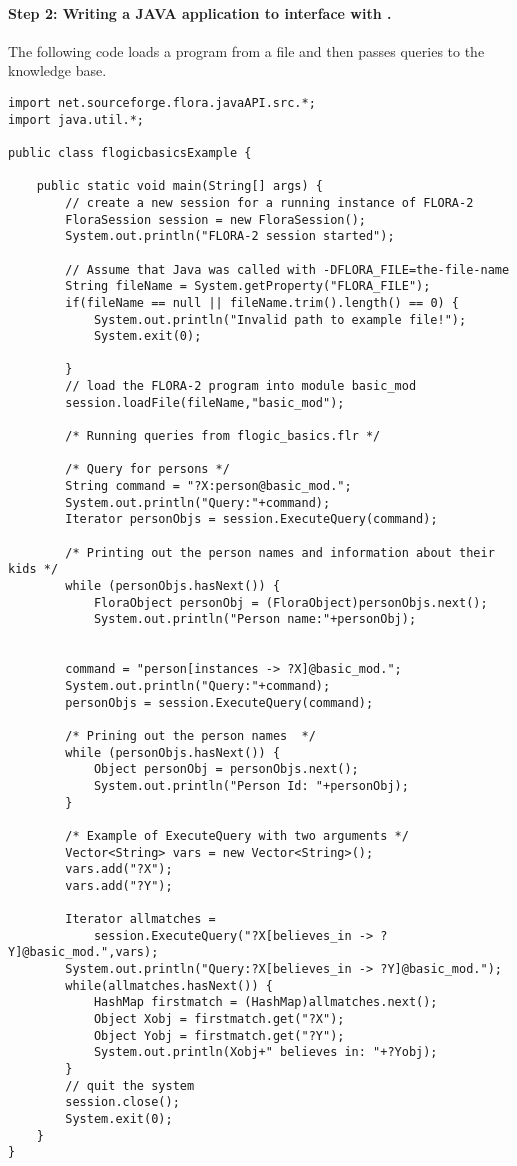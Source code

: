 \paragraph{Step 2:  Writing a JAVA application to interface with \FLORA.}
 The following code loads a \FLORA program from a file and then passes
 queries to the knowledge base.

\begin{verbatim}
import net.sourceforge.flora.javaAPI.src.*;
import java.util.*;

public class flogicbasicsExample {

    public static void main(String[] args) {
        // create a new session for a running instance of FLORA-2
        FloraSession session = new FloraSession();
        System.out.println("FLORA-2 session started");

        // Assume that Java was called with -DFLORA_FILE=the-file-name
        String fileName = System.getProperty("FLORA_FILE");
        if(fileName == null || fileName.trim().length() == 0) {
            System.out.println("Invalid path to example file!");
            System.exit(0);

        }
        // load the FLORA-2 program into module basic_mod
        session.loadFile(fileName,"basic_mod");

        /* Running queries from flogic_basics.flr */

        /* Query for persons */
        String command = "?X:person@basic_mod.";
        System.out.println("Query:"+command);
        Iterator personObjs = session.ExecuteQuery(command);

        /* Printing out the person names and information about their kids */
        while (personObjs.hasNext()) {
            FloraObject personObj = (FloraObject)personObjs.next();
            System.out.println("Person name:"+personObj);


        command = "person[instances -> ?X]@basic_mod.";
        System.out.println("Query:"+command);
        personObjs = session.ExecuteQuery(command);

        /* Prining out the person names  */
        while (personObjs.hasNext()) {
            Object personObj = personObjs.next();
            System.out.println("Person Id: "+personObj);
        }

        /* Example of ExecuteQuery with two arguments */
        Vector<String> vars = new Vector<String>();
        vars.add("?X");
        vars.add("?Y");

        Iterator allmatches =
            session.ExecuteQuery("?X[believes_in -> ?Y]@basic_mod.",vars);
        System.out.println("Query:?X[believes_in -> ?Y]@basic_mod.");
        while(allmatches.hasNext()) {
            HashMap firstmatch = (HashMap)allmatches.next();
            Object Xobj = firstmatch.get("?X");
            Object Yobj = firstmatch.get("?Y");
            System.out.println(Xobj+" believes in: "+?Yobj);
        }
        // quit the system
        session.close();
        System.exit(0);
    }
}
\end{verbatim}

